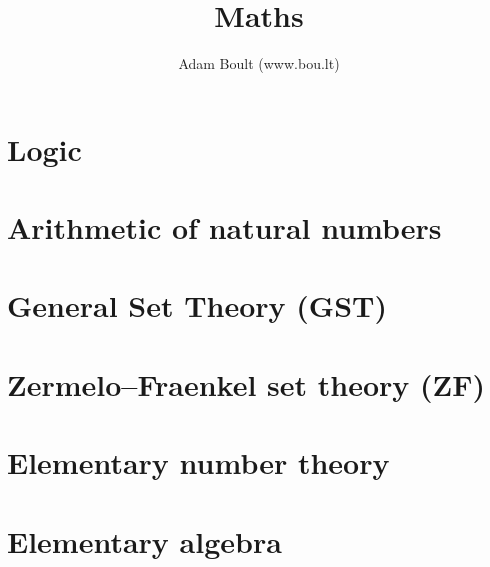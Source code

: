 \documentclass[oneside]{book}
\begin{document}
\author{Adam Boult (www.bou.lt)}
\title{Maths}
\maketitle

\setcounter{tocdepth}{0}
\tableofcontents



\part{Logic}






\part{Arithmetic of natural numbers}













\part{General Set Theory (GST)}






\part{Zermelo–Fraenkel set theory (ZF)}




\part{Elementary number theory}







\part{Elementary algebra}




\end{document}
